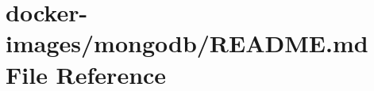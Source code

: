 \hypertarget{docker-images_2mongodb_2_r_e_a_d_m_e_8md}{}\section{docker-\/images/mongodb/\+R\+E\+A\+D\+ME.md File Reference}
\label{docker-images_2mongodb_2_r_e_a_d_m_e_8md}
